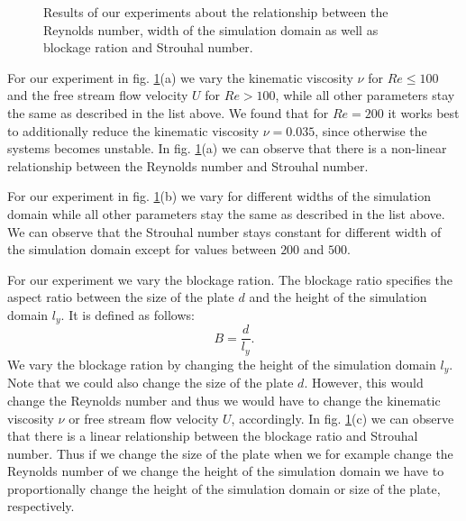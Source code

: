 \documentclass[a4paper,11pt, footsepline]{book}
\begin{document}
\begin{figure}
  \begin{center}
   \caption{Results of our experiments about the relationship between the Reynolds number, width of the simulation domain as well as blockage ration and Strouhal number.}
  \label{fig:vonKarmanExperiments}
  \end{center}
\end{figure}

For our experiment in fig. \ref{fig:vonKarmanExperiments}(a) we vary the kinematic viscosity $\nu$ for $Re\leq 100$ and the free stream flow velocity $U$ for $Re>100$, while all other parameters stay the same as described in the list above. We found that for $Re=200$ it works best to additionally reduce the kinematic viscosity $\nu=0.035$, since otherwise the systems becomes unstable.
In fig. \ref{fig:vonKarmanExperiments}(a) we can observe that there is a non-linear relationship between the Reynolds number and Strouhal number.

For our experiment in fig. \ref{fig:vonKarmanExperiments}(b) we vary for different widths of the simulation domain while all other parameters stay the same as described in the list above. We can observe that the Strouhal number stays constant for different width of the  simulation domain except for values between $200$ and $500$.

For our experiment we vary the blockage ration. The blockage ratio specifies the aspect ratio between the size of the plate $d$ and the height of the simulation domain $l_y$. It is defined as follows:
\begin{equation}
\label{eq-strouhal}
B=\frac{d}{l_y}.
\end{equation}
We vary the blockage ration by changing the height of the simulation domain $l_y$. Note that we could also change the size of the plate $d$. However, this would change the Reynolds number and thus we would have to change the kinematic viscosity $\nu$ or free stream flow velocity $U$, accordingly.
In fig. \ref{fig:vonKarmanExperiments}(c) we can observe that there is a linear relationship between the blockage ratio and Strouhal number. Thus if we change the size of the plate when we for example change the Reynolds number of we change the height of the simulation domain we have to proportionally change the height of the simulation domain or size of the plate, respectively.
\end{document}
